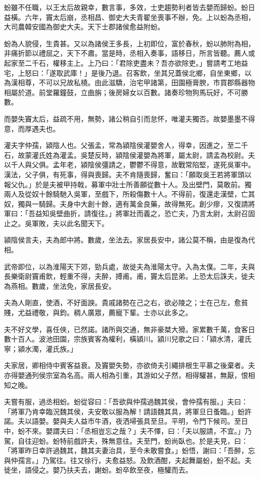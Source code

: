 \begin{pinyinscope}
蚡雖不任職，以王太后故親幸，數言事，多效，士吏趨勢利者皆去嬰而歸蚡。蚡日益橫。六年，竇太后崩，丞相昌、御史大夫青翟坐喪事不辦，免。上以蚡為丞相，大司農韓安國為御史大夫。天下士郡諸侯愈益附蚡。

蚡為人貌侵，生貴甚。又以為諸侯王多長，上初即位，富於春秋，蚡以肺附為相，非痛折節以禮屈之，天下不肅。當是時，丞相入奏事，語移日，所言皆聽。薦人或起家至二千石，權移主上。上乃曰：「君除吏盡未？吾亦欲除吏。」嘗請考工地益宅，上怒曰：「遂取武庫！」是後乃退。召客飲，坐其兄蓋侯北鄉，自坐東鄉，以為漢相尊，不可以兄故私橈。由此滋驕，治宅甲諸第，田園極膏腴，市買郡縣器物相屬於道。前堂羅鐘鼓，立曲旃；後房婦女以百數。諸奏珍物狗馬玩好，不可勝數。

而嬰失竇太后，益疏不用，無勢，諸公稍自引而怠怀，唯灌夫獨否。故嬰墨墨不得意，而厚遇夫也。

灌夫字仲孺，潁陰人也。父張孟，常為潁陰侯灌嬰舍人，得幸，因進之，至二千石，故蒙灌氏姓為灌孟。吳楚反時，潁陰侯灌嬰為將軍，屬太尉，請孟為校尉。夫以千人與父俱。孟年老，潁陰侯彊請之，鬱鬱不得意，故戰常陷堅，遂死吳軍中。漢法，父子俱，有死事，得與喪歸。夫不肯隨喪歸，奮曰：「願取吳王若將軍頭以報父仇。」於是夫被甲持戟，募軍中壯士所善願從數十人。及出壁門，莫敢前。獨兩人及從奴十餘騎馳入吳軍，至戲下，所殺傷數十人。不得前，復還走漢壁，亡其奴，獨與一騎歸。夫身中大創十餘，適有萬金良藥，故得無死。創少瘳，又復請將軍曰：「吾益知吳壁曲折，請復往。」將軍壯而義之，恐亡夫，乃言太尉，太尉召固止之。吳軍敗，夫以此名聞天下。

潁陰侯言夫，夫為郎中將。數歲，坐法去。家居長安中，諸公莫不稱，由是復為代相。

武帝即位，以為淮陽天下郊，勁兵處，故徙夫為淮陽太守。入為太僕。二年，夫與長樂衛尉竇甫飲，輕重不得，夫醉，搏甫。甫，竇太后昆弟。上恐太后誅夫，徙夫為燕相。數歲，坐法免，家居長安。

夫為人剛直，使酒，不好面諛。貴戚諸勢在己之右，欲必陵之；士在己左，愈貧賤，尤益禮敬，與鈞。稠人廣眾，薦寵下輩。士亦以此多之。

夫不好文學，喜任俠，已然諾。諸所與交通，無非豪桀大猾。家累數千萬，食客日數十百人。波池田園，宗族賓客為權利，橫潁川。潁川兒歌之曰：「潁水清，灌氏寧；潁水濁，灌氏族。」

夫家居，卿相侍中賓客益衰。及竇嬰失勢，亦欲倚夫引繩排根生平慕之後棄者。夫亦得嬰通列侯宗室為名高。兩人相為引重，其游如父子然，相得驩甚，無厭，恨相知之晚。

夫嘗有服，過丞相蚡。蚡從容曰：「吾欲與仲孺過魏其侯，會仲孺有服。」夫曰：「將軍乃肯幸臨況魏其侯，夫安敢以服為解！請語魏其具，將軍旦日蚤臨。」蚡許諾。夫以語嬰。嬰與夫人益巿牛酒，夜洒埽張具至旦。平明，令門下候司。至日中，蚡不來。嬰謂夫曰：「丞相豈忘之哉？」夫不懌，曰：「夫以服請，不宜。」乃駕，自往迎蚡。蚡特前戲許夫，殊無意往。夫至門，蚡尚臥也。於是夫見，曰：「將軍昨日幸許過魏其，魏其夫妻治具，至今未敢嘗食。」蚡悟，謝曰：「吾醉，忘與仲孺言。」乃駕往。往又徐行，夫愈益怒。及飲酒酣，夫起舞屬蚡，蚡不起。夫徙坐，語侵之。嬰乃扶夫去，謝蚡。蚡卒飲至夜，極驩而去。


\end{pinyinscope}
